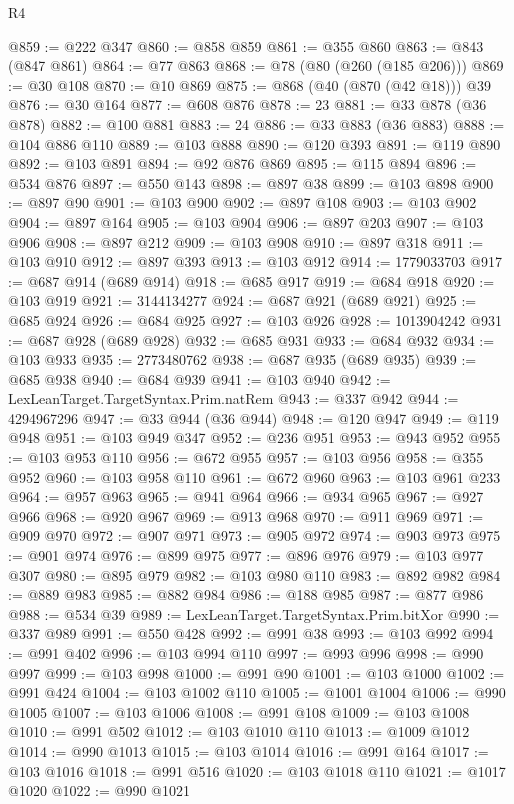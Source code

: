\begin{lexlean}{R4}
\begin{coremodule}
@859 := @222 @347
@860 := @858 @859
@861 := @355 @860
@863 := @843 (@847 @861)
@864 := @77 @863
@868 := @78 (@80 (@260 (@185 @206)))
@869 := @30 @108
@870 := @10 @869
@875 := @868 (@40 (@870 (@42 @18))) @39
@876 := @30 @164
@877 := @608 @876
@878 := 23
@881 := @33 @878 (@36 @878)
@882 := @100 @881
@883 := 24
@886 := @33 @883 (@36 @883)
@888 := @104 @886 @110
@889 := @103 @888
@890 := @120 @393
@891 := @119 @890
@892 := @103 @891
@894 := @92 @876 @869
@895 := @115 @894
@896 := @534 @876
@897 := @550 @143
@898 := @897 @38
@899 := @103 @898
@900 := @897 @90
@901 := @103 @900
@902 := @897 @108
@903 := @103 @902
@904 := @897 @164
@905 := @103 @904
@906 := @897 @203
@907 := @103 @906
@908 := @897 @212
@909 := @103 @908
@910 := @897 @318
@911 := @103 @910
@912 := @897 @393
@913 := @103 @912
@914 := 1779033703
@917 := @687 @914 (@689 @914)
@918 := @685 @917
@919 := @684 @918
@920 := @103 @919
@921 := 3144134277
@924 := @687 @921 (@689 @921)
@925 := @685 @924
@926 := @684 @925
@927 := @103 @926
@928 := 1013904242
@931 := @687 @928 (@689 @928)
@932 := @685 @931
@933 := @684 @932
@934 := @103 @933
@935 := 2773480762
@938 := @687 @935 (@689 @935)
@939 := @685 @938
@940 := @684 @939
@941 := @103 @940
@942 := LexLeanTarget.TargetSyntax.Prim.natRem
@943 := @337 @942
@944 := 4294967296
@947 := @33 @944 (@36 @944)
@948 := @120 @947
@949 := @119 @948
@951 := @103 @949 @347
@952 := @236 @951
@953 := @943 @952
@955 := @103 @953 @110
@956 := @672 @955
@957 := @103 @956
@958 := @355 @952
@960 := @103 @958 @110
@961 := @672 @960
@963 := @103 @961 @233
@964 := @957 @963
@965 := @941 @964
@966 := @934 @965
@967 := @927 @966
@968 := @920 @967
@969 := @913 @968
@970 := @911 @969
@971 := @909 @970
@972 := @907 @971
@973 := @905 @972
@974 := @903 @973
@975 := @901 @974
@976 := @899 @975
@977 := @896 @976
@979 := @103 @977 @307
@980 := @895 @979
@982 := @103 @980 @110
@983 := @892 @982
@984 := @889 @983
@985 := @882 @984
@986 := @188 @985
@987 := @877 @986
@988 := @534 @39
@989 := LexLeanTarget.TargetSyntax.Prim.bitXor
@990 := @337 @989
@991 := @550 @428
@992 := @991 @38
@993 := @103 @992
@994 := @991 @402
@996 := @103 @994 @110
@997 := @993 @996
@998 := @990 @997
@999 := @103 @998
@1000 := @991 @90
@1001 := @103 @1000
@1002 := @991 @424
@1004 := @103 @1002 @110
@1005 := @1001 @1004
@1006 := @990 @1005
@1007 := @103 @1006
@1008 := @991 @108
@1009 := @103 @1008
@1010 := @991 @502
@1012 := @103 @1010 @110
@1013 := @1009 @1012
@1014 := @990 @1013
@1015 := @103 @1014
@1016 := @991 @164
@1017 := @103 @1016
@1018 := @991 @516
@1020 := @103 @1018 @110
@1021 := @1017 @1020
@1022 := @990 @1021

\end{coremodule}
\end{lexlean}
